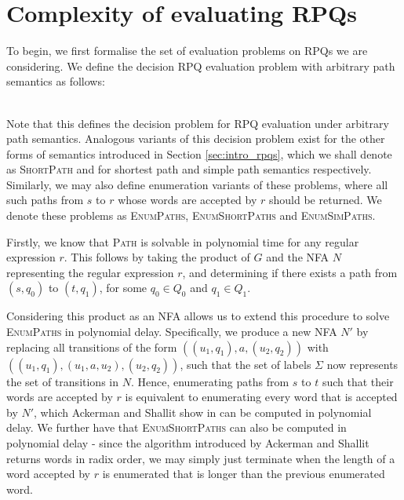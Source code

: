 \documentclass{article}
\begin{document}
\section{Complexity of evaluating RPQs}
\label{sec:complexity}

To begin, we first formalise the set of evaluation problems on RPQs we are considering. We define the decision RPQ evaluation problem with arbitrary path semantics as follows:

 \\

Note that this defines the decision problem for RPQ evaluation under arbitrary path semantics. Analogous variants of this decision problem exist for the other forms of semantics introduced in Section \ref{sec:intro_rpqs}, which we shall denote as \textsc{ShortPath} and  for shortest path and simple path semantics respectively. Similarly, we may also define enumeration variants of these problems, where all such paths from $s$ to $r$ whose words are accepted by $r$ should be returned. We denote these problems as \textsc{EnumPaths}, \textsc{EnumShortPaths} and \textsc{EnumSimPaths}.

Firstly, we know that \textsc{Path} is solvable in polynomial time for any regular expression $r$. This follows by taking the product of $G$ and the NFA $N$ representing the regular expression $r$, and determining if there exists a path from $(s, q_0)$ to $(t, q_1)$, for some $q_0 \in Q_0$ and $q_1 \in Q_1$.

Considering this product as an NFA allows us to extend this procedure to solve \textsc{EnumPaths} in polynomial delay. Specifically, we produce a new NFA $N'$ by replacing all transitions of the form $((u_1, q_1), a, (u_2, q_2))$ with $((u_1, q_1), (u_1, a, u_2), (u_2, q_2))$, such that the set of labels $\Sigma$ now represents the set of transitions in $N$. Hence, enumerating paths from $s$ to $t$ such that their words are accepted by $r$ is equivalent to enumerating every word that is accepted by $N'$, which Ackerman and Shallit show in \cite{ackermanEfficientEnumerationWords2009} can be computed in polynomial delay. We further have that \textsc{EnumShortPaths} can also be computed in polynomial delay - since the algorithm introduced by Ackerman and Shallit returns words in radix order, we may simply just terminate when the length of a word accepted by $r$ is enumerated that is longer than the previous enumerated word.
\end{document}
